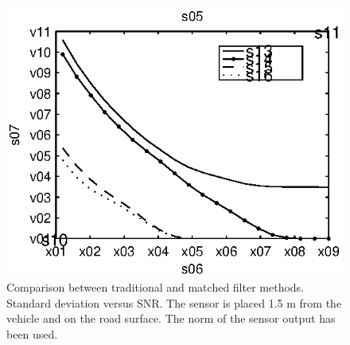 \begin{subfigures}
\begin{figure}[!tbh]
\begin{minipage}{0.45\linewidth}
   \includegraphics[width=\linewidth]{images/std_error_r}
  \caption[Time difference, method comparison. Error standard deviation. Norm.]{Comparison between traditional and matched filter methods. Standard deviation versus SNR. The sensor is placed 1.5 m from the vehicle and on the road surface. The norm of the sensor output has been used.}
  \label{fig:comp_std_r}
  \end{minipage}
 \end{figure}
\end{subfigures}

